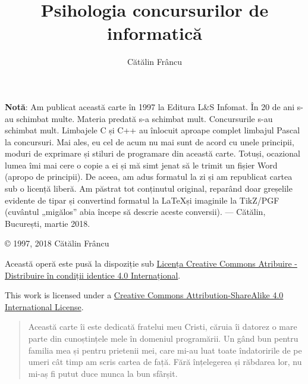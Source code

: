 \documentclass[12pt, twoside, a4paper]{book}
\title{Psihologia concursurilor de informatică}
\author{Cătălin Frâncu}
\date{}
\begin{document}

  \begin{titlepage}
    \maketitle
    \thispagestyle{empty} %
  \end{titlepage}

  \textbf{Notă}: Am publicat această carte în 1997 la Editura L\&S Infomat. În
  20 de ani s-au schimbat multe. Materia predată s-a schimbat
  mult. Concursurile s-au schimbat mult. Limbajele C și C++ au înlocuit
  aproape complet limbajul Pascal la concursuri. Mai ales, eu cel de acum nu
  mai sunt de acord cu unele principii, moduri de exprimare și stiluri de
  programare din această carte. Totuși, ocazional lumea îmi mai cere o copie a
  ei și mă simt jenat să le trimit un fișier Word (apropo de principii). De
  aceea, am adus formatul la zi și am republicat cartea sub o licență
  liberă. Am păstrat tot conținutul original, reparând doar greșelile evidente
  de tipar și convertind formatul la \LaTeX și imaginile la TikZ/PGF (cuvântul
  „migălos” abia începe să descrie aceste conversii). — Cătălin, București,
  martie 2018.

  \vspace*{\fill}

  © 1997, 2018 Cătălin Frâncu

  Această operă este pusă la dispoziție sub
  \href{https://creativecommons.org/licenses/by-sa/4.0/deed.ro}{Licența
    Creative Commons Atribuire - Distribuire în condiții identice 4.0
    Internațional}.

  This work is licensed under a
  \href{https://creativecommons.org/licenses/by-sa/4.0/}{Creative Commons
    Attribution-ShareAlike 4.0 International License}.


  \newpage
  \thispagestyle{empty}

  \begin{quote}
    Această carte îi este dedicată fratelui meu Cristi, căruia îi datorez o
    mare parte din cunoștințele mele în domeniul programării. Un gând bun
    pentru familia mea și pentru prietenii mei, care mi-au luat toate
    îndatoririle de pe umeri cât timp am scris cartea de față. Fără
    înțelegerea și răbdarea lor, nu mi-aș fi putut duce munca la bun sfârșit.
  \end{quote}

  \newpage
  \thispagestyle{empty}

  
  
  
  
  
  
  
  
  
  
  
  
  
  
  
  
  
  
  
  
  
  
  
  
  
  

  \tableofcontents
\end{document}
